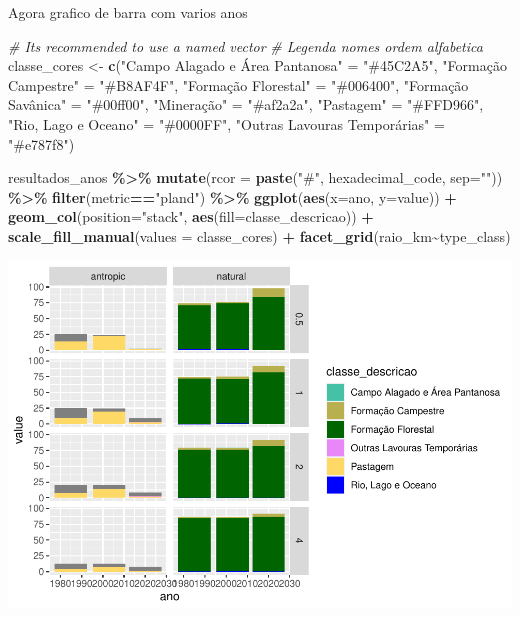 \documentclass[
]{article}
\newenvironment{Shaded}{\begin{snugshade}}{\end{snugshade}}
\newcommand{\AttributeTok}[1]{\textcolor[rgb]{0.13,0.29,0.53}{#1}}
\newcommand{\CommentTok}[1]{\textcolor[rgb]{0.56,0.35,0.01}{\textit{#1}}}
\newcommand{\FunctionTok}[1]{\textcolor[rgb]{0.13,0.29,0.53}{\textbf{#1}}}
\newcommand{\NormalTok}[1]{#1}
\newcommand{\OtherTok}[1]{\textcolor[rgb]{0.56,0.35,0.01}{#1}}
\newcommand{\SpecialCharTok}[1]{\textcolor[rgb]{0.81,0.36,0.00}{\textbf{#1}}}
\newcommand{\StringTok}[1]{\textcolor[rgb]{0.31,0.60,0.02}{#1}}
\begin{document}
Agora grafico de barra com varios anos

\begin{Shaded}
\begin{Highlighting}[]
\CommentTok{\# It\textquotesingle{}s recommended to use a named vector}
\CommentTok{\# Legenda nomes ordem alfabetica}
\NormalTok{classe\_cores }\OtherTok{\textless{}{-}} \FunctionTok{c}\NormalTok{(}\StringTok{"Campo Alagado e Área Pantanosa"} \OtherTok{=} \StringTok{"\#45C2A5"}\NormalTok{, }
\StringTok{"Formação Campestre"} \OtherTok{=} \StringTok{"\#B8AF4F"}\NormalTok{, }
\StringTok{"Formação Florestal"} \OtherTok{=} \StringTok{"\#006400"}\NormalTok{, }
\StringTok{"Formação Savânica"} \OtherTok{=} \StringTok{"\#00ff00"}\NormalTok{, }
\StringTok{"Mineração"} \OtherTok{=} \StringTok{"\#af2a2a"}\NormalTok{, }
\StringTok{"Pastagem"} \OtherTok{=} \StringTok{"\#FFD966"}\NormalTok{, }
\StringTok{"Rio, Lago e Oceano"} \OtherTok{=} \StringTok{"\#0000FF"}\NormalTok{,}
\StringTok{"Outras Lavouras Temporárias"} \OtherTok{=} \StringTok{"\#e787f8"}\NormalTok{) }

\NormalTok{resultados\_anos }\SpecialCharTok{\%\textgreater{}\%} 
  \FunctionTok{mutate}\NormalTok{(}\AttributeTok{rcor =} \FunctionTok{paste}\NormalTok{(}\StringTok{"\#"}\NormalTok{, hexadecimal\_code, }\AttributeTok{sep=}\StringTok{""}\NormalTok{)) }\SpecialCharTok{\%\textgreater{}\%} 
  \FunctionTok{filter}\NormalTok{(metric}\SpecialCharTok{==}\StringTok{"pland"}\NormalTok{) }\SpecialCharTok{\%\textgreater{}\%}
  \FunctionTok{ggplot}\NormalTok{(}\FunctionTok{aes}\NormalTok{(}\AttributeTok{x=}\NormalTok{ano, }\AttributeTok{y=}\NormalTok{value)) }\SpecialCharTok{+} 
  \FunctionTok{geom\_col}\NormalTok{(}\AttributeTok{position=}\StringTok{"stack"}\NormalTok{, }\FunctionTok{aes}\NormalTok{(}\AttributeTok{fill=}\NormalTok{classe\_descricao)) }\SpecialCharTok{+} 
  \FunctionTok{scale\_fill\_manual}\NormalTok{(}\AttributeTok{values =}\NormalTok{ classe\_cores) }\SpecialCharTok{+}
  \FunctionTok{facet\_grid}\NormalTok{(raio\_km}\SpecialCharTok{\textasciitilde{}}\NormalTok{type\_class)}
\end{Highlighting}
\end{Shaded}

\includegraphics{epr_files/figure-latex/unnamed-chunk-70-1.pdf}
\end{document}
